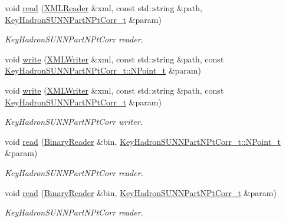\begin{DoxyCompactItemize}
\item 
void \mbox{\hyperlink{namespaceHadron_a921e2dea91400934dabd596c18164033}{read}} (\mbox{\hyperlink{classADATXML_1_1XMLReader}{X\+M\+L\+Reader}} \&xml, const std\+::string \&path, \mbox{\hyperlink{structHadron_1_1KeyHadronSUNNPartNPtCorr__t}{Key\+Hadron\+S\+U\+N\+N\+Part\+N\+Pt\+Corr\+\_\+t}} \&param)
\begin{DoxyCompactList}\small\item\em Key\+Hadron\+S\+U\+N\+N\+Part\+N\+Pt\+Corr reader. \end{DoxyCompactList}\item 
void \mbox{\hyperlink{namespaceHadron_a5dd8ceac99cd9e526324bf30fca8e225}{write}} (\mbox{\hyperlink{classADATXML_1_1XMLWriter}{X\+M\+L\+Writer}} \&xml, const std\+::string \&path, const \mbox{\hyperlink{structHadron_1_1KeyHadronSUNNPartNPtCorr__t_1_1NPoint__t}{Key\+Hadron\+S\+U\+N\+N\+Part\+N\+Pt\+Corr\+\_\+t\+::\+N\+Point\+\_\+t}} \&param)
\item 
void \mbox{\hyperlink{namespaceHadron_abf12b2168d7e3741fcc320bf4b8c53df}{write}} (\mbox{\hyperlink{classADATXML_1_1XMLWriter}{X\+M\+L\+Writer}} \&xml, const std\+::string \&path, const \mbox{\hyperlink{structHadron_1_1KeyHadronSUNNPartNPtCorr__t}{Key\+Hadron\+S\+U\+N\+N\+Part\+N\+Pt\+Corr\+\_\+t}} \&param)
\begin{DoxyCompactList}\small\item\em Key\+Hadron\+S\+U\+N\+N\+Part\+N\+Pt\+Corr writer. \end{DoxyCompactList}\item 
void \mbox{\hyperlink{namespaceHadron_a61a08fc66a0ee31593a2d5fff5657f7c}{read}} (\mbox{\hyperlink{classADATIO_1_1BinaryReader}{Binary\+Reader}} \&bin, \mbox{\hyperlink{structHadron_1_1KeyHadronSUNNPartNPtCorr__t_1_1NPoint__t}{Key\+Hadron\+S\+U\+N\+N\+Part\+N\+Pt\+Corr\+\_\+t\+::\+N\+Point\+\_\+t}} \&param)
\begin{DoxyCompactList}\small\item\em Key\+Hadron\+S\+U\+N\+N\+Part\+N\+Pt\+Corr reader. \end{DoxyCompactList}\item 
void \mbox{\hyperlink{namespaceHadron_a475e00d642e0578e7bbe956bbbf37aac}{read}} (\mbox{\hyperlink{classADATIO_1_1BinaryReader}{Binary\+Reader}} \&bin, \mbox{\hyperlink{structHadron_1_1KeyHadronSUNNPartNPtCorr__t}{Key\+Hadron\+S\+U\+N\+N\+Part\+N\+Pt\+Corr\+\_\+t}} \&param)
\begin{DoxyCompactList}\small\item\em Key\+Hadron\+S\+U\+N\+N\+Part\+N\+Pt\+Corr reader. \end{DoxyCompactList}\item 

\end{DoxyCompactItemize}
